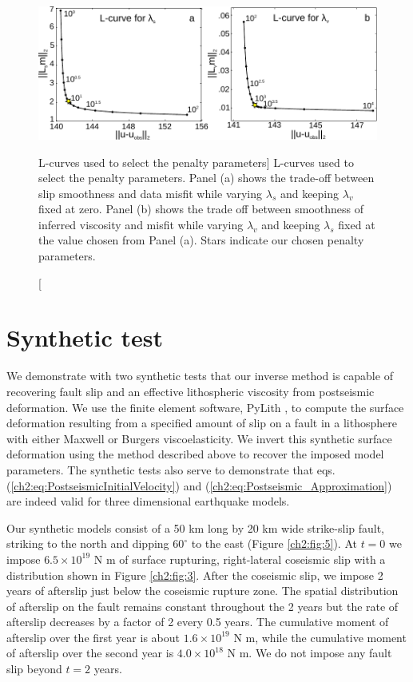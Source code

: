 \begin{figure}
\includegraphics{ch2/figures/Fig2.pdf}
\caption
[L-curves used to select the penalty parameters]
{L-curves used to select the penalty parameters. Panel (a)
shows the trade-off between slip smoothness and data misfit while
varying $\lambda_s$ and keeping $\lambda_v$ fixed at zero.  Panel (b)
shows the trade off between smoothness of inferred viscosity and
misfit while varying $\lambda_v$ and keeping $\lambda_s$ fixed at the
value chosen from Panel (a).  Stars indicate our chosen penalty
parameters.}
\label{ch2:fig:2}
\end{figure}

\section{Synthetic test}\label{ch2:sec:SynthTest}
We demonstrate with two synthetic tests that our inverse method is
capable of recovering fault slip and an effective lithospheric
viscosity from postseismic deformation.  We use the finite element
software, PyLith \citep{Aagaard2013}, to compute the surface deformation
resulting from a specified amount of slip on a fault in a lithosphere
with either Maxwell or Burgers viscoelasticity.  We invert this
synthetic surface deformation using the method described above to
recover the imposed model parameters.  The synthetic tests also serve
to demonstrate that eqs. (\ref{ch2:eq:PostseismicInitialVelocity}) and
(\ref{ch2:eq:Postseismic_Approximation}) are indeed valid for three
dimensional earthquake models.

Our synthetic models consist of a 50 km long by 20 km wide strike-slip
fault, striking to the north and dipping $60^{\circ}$ to the east
(Figure \ref{ch2:fig:5}). At $t=0$ we impose $6.5\times 10^{19}$ N m of surface
rupturing, right-lateral coseismic slip with a distribution shown in
Figure \ref{ch2:fig:3}. After the coseismic slip, we impose 2 years of afterslip just
below the coseismic rupture zone.  The spatial distribution of
afterslip on the fault remains constant throughout the 2 years but the
rate of afterslip decreases by a factor of 2 every 0.5 years.  The
cumulative moment of afterslip over the first year is about $1.6\times
10^{19}$ N m, while the cumulative moment of afterslip over the second
year is $4.0\times 10^{18}$ N m.  We do not impose any fault slip
beyond $t=2$ years.

